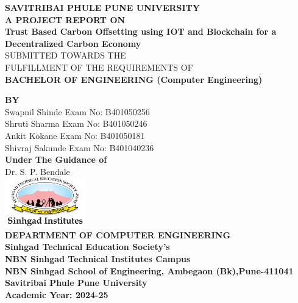 \documentclass[oneside,a4paper,12pt]{book}
\begin{document}
\setlength{\parindent}{0mm}
\begin{center}
{\bfseries SAVITRIBAI PHULE PUNE UNIVERSITY \\}
 \vspace*{1\baselineskip}
{\bfseries A  PROJECT REPORT ON \\}
 \vspace*{2\baselineskip}
{\bfseries \fontsize{12}{12} \selectfont  Trust Based Carbon Offsetting using IOT and Blockchain for a Decentralized Carbon Economy \\ \vspace*{2\baselineskip}}
{\fontsize{12}{12} \selectfont SUBMITTED TOWARDS THE
 \\FULFILLMENT OF THE REQUIREMENTS OF \\

\vspace*{2\baselineskip}}
{\bfseries \fontsize{12}{12} \selectfont BACHELOR OF ENGINEERING (Computer
Engineering) \\}

{\bfseries \fontsize{12}{12} \selectfont BY \\ 
\vspace*{1\baselineskip}} 
Swapnil Shinde \hspace{28 mm}   Exam No: B401050256  \\
Shruti Sharma \hspace{28 mm} Exam No: B401050246 \\
Ankit Kokane \hspace{28 mm} Exam No: B401050181  \\
Shivraj Sakunde \hspace{24 mm} Exam No: B401040236  \\
\vspace*{1.5\baselineskip}
{\bfseries \fontsize{14}{12} \selectfont Under The Guidance of \\  
\vspace*{1\baselineskip}} 
Dr. S. P. Bendale\\
\vspace*{1\baselineskip}
\includegraphics[width=100pt]{Logo-1606151851.jpg} \\

\centering
{\bfseries \fontsize{14}{12} \selectfont DEPARTMENT OF COMPUTER ENGINEERING }\\
\centering
{\bfseries \fontsize{11}{11} \selectfont
Sinhgad Technical Education Society's} \\
\centering
{\bfseries \fontsize{14}{12} \selectfont
NBN Sinhgad Technical Institutes Campus \\
NBN Sinhgad School of Engineering, Ambegaon (Bk),Pune-411041\\
Savitribai Phule Pune University \\
Academic Year: 2024-25
}
\end{center}
\end{document}
